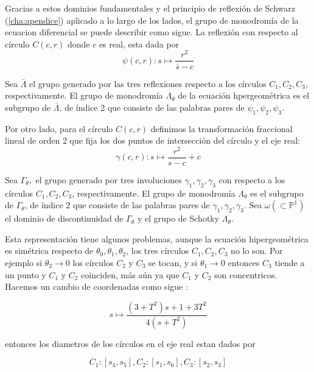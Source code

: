 Gracias a estos dominios fundamentales y el principio de reflexi\'on de Schwarz (\ref{cha:apendice}) aplicado a lo largo de los lados, el grupo de monodrom\'ia de la ecuacion diferencial se puede describir como sigue. La reflexi\'on con respecto al c\'irculo $C(c,r)$ donde $c$ es real, esta dada por  $$\psi(c,r): s \mapsto \frac{r^{2}}{\bar{s} - c}  $$

Sea $\bar{\Lambda}$ el grupo generado por las tres reflexiones respecto a los c\'irculos $C_{1},C_{2},C_{3}$, respectivamente. El grupo de monodrom\'ia $\Lambda_{\theta}$ de la ecuaci\'on hpergeom\'etrica es el subgrupo de $\bar{\Lambda}$, de \'indice 2 que consiste de las palabras pares de $\psi_{1},\psi_{2}, \psi_{3}$.

Por otro lado, para el c\'irculo $C(c,r)$ definimos la transformaci\'on fraccional lineal de orden 2 que fija los dos puntos de intersecci\'on del c\'irculo y el eje real: $$\gamma (c,r): s \mapsto \frac{r^{2}}{s-c} + c $$


Sea $\Gamma _{\theta},$ el grupo generado por tres involuciones $\gamma_{1},\gamma_{2},\gamma_{3}$ con respecto a los c\'irculos $C_{1},C_{2},C_{3}$, respectivamente.
El grupo de monodrom\'ia $\Lambda_{\theta }$ es el subgrupo de $\Gamma_{\theta}$, de \'indice 2 que consiste de las palabras pares de $\gamma_{1},\gamma_{2},\gamma_{3}$. Sea $\omega ( \subset \mathbb{P}^{1})$ el dominio de discontinuidad de $\Gamma_{\theta}$ y el grupo de Schotky $\Lambda_{\theta}$.

Esta representaci\'on tiene algunos problemas, aunque la ecuaci\'on hipergeom\'etrica es sim\'etrica respecto de $\theta_{0},\theta_{1},\theta_{2}$, los tres c\'irculos $C_{1},C_{2},C_{3}$ no lo son. Por ejemplo si $\theta_{2} \rightarrow 0$ los c\'irculos $C_{2}$ y $C_{3}$ se tocan, y si $\theta_{1} \rightarrow 0$ entonces $C_{3}$ tiende a un punto y $C_{1}$ y $C_{2}$ coinciden, m\'as a\'un ya que $C_{1}$  y $C_{2}$ son concentricos. Hacemos un cambio de coordenadas como sigue :

$$s \mapsto \frac{(3 + T^{2})s + 1 + 3T^{2}}{4(s + T^{2})} $$

 entonces los diametros de los c\'irculos en el eje real estan dados por

  $$ C_{1}:[s_{4},s_{5}],C_{2}:[s_{1},s_{6}],C_{3}:[s_{2},s_{3}]$$

